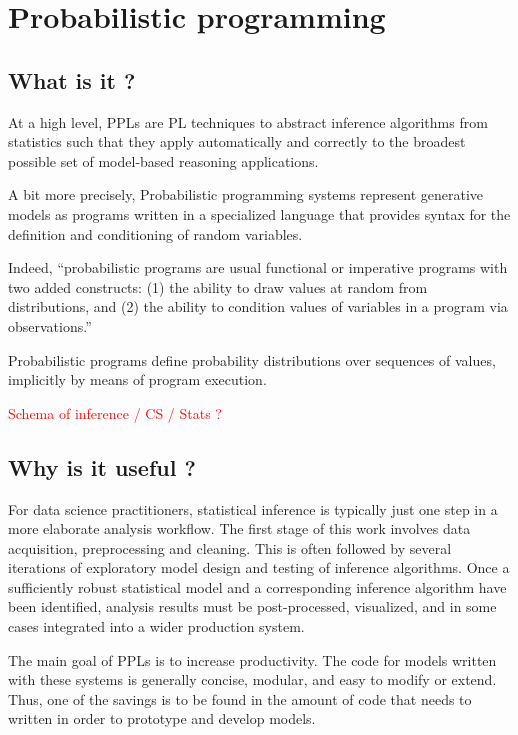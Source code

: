\chapter{Probabilistic programming}

\section{What is it ?} \label{PPL_def}
At a high level, \gls{PPL}s are \gls{PL} techniques to abstract inference algorithms from statistics such that they apply automatically and correctly to the broadest possible set of model-based reasoning applications.

A bit more precisely, Probabilistic programming systems \cite{Goodman:2012uq,dippl,Mansinghka:2014ty,wood-aistats-2014} represent generative models as programs written in a specialized language that provides syntax for the definition and conditioning of random variables.

Indeed, ``probabilistic programs are usual functional or imperative programs with two added constructs: 
(1) the ability to draw values at random from distributions, and 
(2) the ability to condition values of variables in a program via observations.'' \cite{Gordon:2014:PP:2593882.2593900}

Probabilistic programs define probability distributions over sequences of values, implicitly by means of program execution.

\textcolor{red}{Schema of inference / CS / Stats ?}

\section{Why is it useful ?}
For data science practitioners, statistical inference is typically just one step in a more elaborate analysis workflow. The first stage of this work involves data acquisition, preprocessing and cleaning. This is often followed by several iterations of exploratory model design and testing of inference algorithms. Once a sufficiently robust statistical model and a corresponding inference algorithm have been identified, analysis results must be post-processed, visualized, and in some cases integrated into a wider production system.

The main goal of \gls{PPL}s is to increase productivity. 
The code for models written with these systems is generally concise, modular, and easy to modify or extend.
Thus, one of the savings is to be found in the amount of code that needs to written in order to prototype and develop models.

